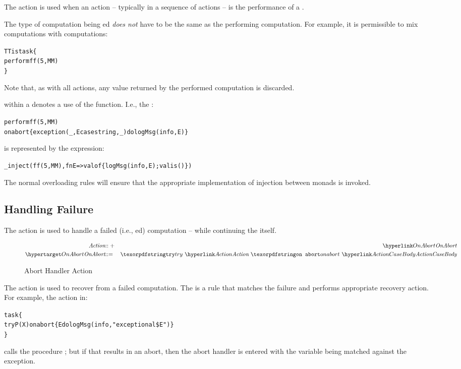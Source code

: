 The  action is used when an action -- typically in a sequence of actions -- is the performance of a .

\begin{aside}
The type of computation being ed \emph{does not} have to be the same as the performing computation. For example, it is permissible to mix  computations with  computations:
\begin{alltt}
TT is task\{
  perform ff(5,MM)
\}
\end{alltt}
Note that, as with all actions, any value returned by the performed computation is discarded.
\end{aside}

\begin{aside}
 within a  denotes a use of the  function. I.e., the :
\begin{alltt}
perform ff(5,MM)
    on abort \{ exception(_,E case string,_) do logMsg(info,E) \}
\end{alltt}
is represented by the expression:
\begin{alltt}
\_inject(ff(5,MM),fn E => valof\{ logMsg(info,E); valis () \})
\end{alltt}
The normal overloading rules will ensure that the appropriate implementation of injection between monads is invoked.
\end{aside}

\subsection{Handling Failure}
\label{failAction}

The  action is used to handle a failed (i.e., ed) computation -- while continuing the  itself.

\begin{figure}[hbtp]
\begin{eqnarray*}
\emph{Action}&\arrowplus&\ntRef{OnAbort}\\
\ntDef{OnAbort}&\arrow&\q{try}\ \ntRef{Action}\ \q{on abort}\ \ntRef{ActionCaseBody}
\end{eqnarray*}
\caption{Abort Handler Action}
\label{failHandleFig}
\end{figure}

The  action is used to recover from a failed computation. The  is a rule that matches the failure and performs appropriate recovery action. For example, the action in:
\begin{alltt}
task\{
  try P(X) on abort \{ E do logMsg(info,"exceptional \$E") \}
\}
\end{alltt}
calls the procedure ; but if that results in an abort, then the abort handler is entered with the variable  being matched against the exception. 

